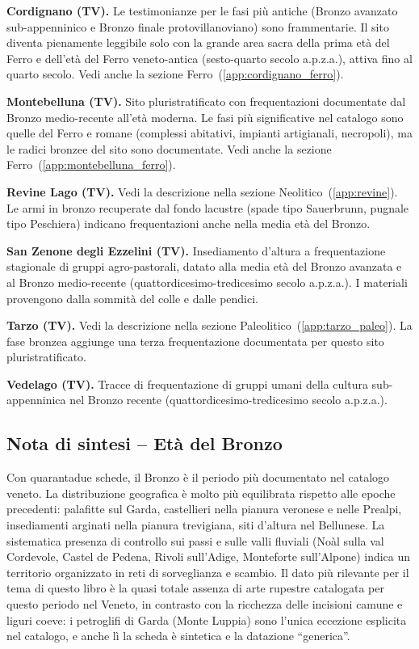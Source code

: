 \textbf{Cordignano (TV).} \label{app:cordignano_bronzo} Le testimonianze per le fasi più antiche (Bronzo avanzato sub-appenninico e Bronzo finale protovillanoviano) sono frammentarie. Il sito diventa pienamente leggibile solo con la grande area sacra della prima età del Ferro e dell'età del Ferro veneto-antica (sesto-quarto secolo a.p.z.a.), attiva fino al quarto secolo. Vedi anche la sezione Ferro~(\ref{app:cordignano_ferro}).

\textbf{Montebelluna (TV).} \label{app:montebelluna_bronzo} Sito pluristratificato con frequentazioni documentate dal Bronzo medio-recente all'età moderna. Le fasi più significative nel catalogo sono quelle del Ferro e romane (complessi abitativi, impianti artigianali, necropoli), ma le radici bronzee del sito sono documentate. Vedi anche la sezione Ferro~(\ref{app:montebelluna_ferro}).

\textbf{Revine Lago (TV).} \label{app:revine_bronzo} Vedi la descrizione nella sezione Neolitico~(\ref{app:revine}). Le armi in bronzo recuperate dal fondo lacustre (spade tipo Sauerbrunn, pugnale tipo Peschiera) indicano frequentazioni anche nella media età del Bronzo.

\textbf{San Zenone degli Ezzelini (TV).} Insediamento d'altura a frequentazione stagionale di gruppi agro-pastorali, datato alla media età del Bronzo avanzata e al Bronzo medio-recente (quattordicesimo-tredicesimo secolo a.p.z.a.). I materiali provengono dalla sommità del colle e dalle pendici.

\textbf{Tarzo (TV).} \label{app:tarzo_bronzo} Vedi la descrizione nella sezione Paleolitico~(\ref{app:tarzo_paleo}). La fase bronzea aggiunge una terza frequentazione documentata per questo sito pluristratificato.

\textbf{Vedelago (TV).} Tracce di frequentazione di gruppi umani della cultura sub-appenninica nel Bronzo recente (quattordicesimo-tredicesimo secolo a.p.z.a.).

\subsection*{Nota di sintesi -- Età del Bronzo}

Con quarantadue schede, il Bronzo è il periodo più documentato nel catalogo veneto. La distribuzione geografica è molto più equilibrata rispetto alle epoche precedenti: palafitte sul Garda, castellieri nella pianura veronese e nelle Prealpi, insediamenti arginati nella pianura trevigiana, siti d'altura nel Bellunese. La sistematica presenza di controllo sui passi e sulle valli fluviali (Noàl sulla val Cordevole, Castel de Pedena, Rivoli sull'Adige, Monteforte sull'Alpone) indica un territorio organizzato in reti di sorveglianza e scambio. Il dato più rilevante per il tema di questo libro è la quasi totale assenza di arte rupestre catalogata per questo periodo nel Veneto, in contrasto con la ricchezza delle incisioni camune e liguri coeve: i petroglifi di Garda (Monte Luppia) sono l'unica eccezione esplicita nel catalogo, e anche lì la scheda è sintetica e la datazione ``generica''.

